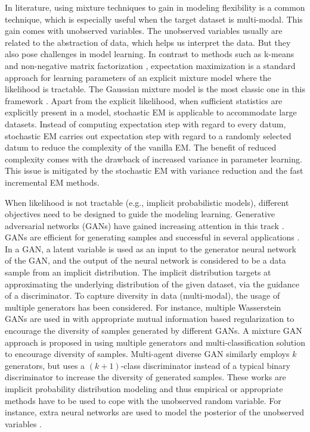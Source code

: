 In literature, using mixture techniques to gain in modeling flexibility is a common technique, which is especially useful when the target dataset is multi-modal. This gain comes with unobserved variables. The unobserved variables usually are related to the abstraction of data, which helps us interpret the data. But they also pose challenges in model learning. In contrast to methods such as k-means \cite{ICML-2012-KulisJ} and non-negative matrix factorization \cite{zhirong2016JMLR}, expectation maximization \cite{dempster1977maximum} is a standard approach for learning parameters of an explicit mixture model where the likelihood is tractable. The Gaussian mixture model is the most classic one in this framework \cite{Bishop:2006:PRM:1162264}.
Apart from the explicit likelihood, when sufficient statistics are explicitly present in a model, stochastic EM \cite{cappe2009sem} is applicable to accommodate large datasets. Instead of computing expectation step with regard to every datum, stochastic EM carries out expectation step with regard to a randomly selected datum to reduce the complexity of the vanilla EM. The benefit of reduced complexity comes with the drawback of increased variance in parameter learning. This issue is mitigated by the stochastic EM with variance reduction\cite{chen2018emvr} and the fast incremental EM \cite{karimi2019incrementalEM} methods.


When likelihood is not tractable (e.g., implicit probabilistic models), different objectives need to be designed to guide the modeling learning. Generative adversarial networks (GANs) have gained increasing attention in this track \cite{goodfellow2014gan, NIPS2016_6125, 2018arXiv180508318Z, salimans2018improving}.
GANs are efficient for generating samples and successful in several applications \cite{ledig2017photo, NIPS2016_6125}. In a GAN, a latent variable is used as
an input to the generator neural network of the GAN, and the output of the neural network is considered to be a data sample from an implicit distribution. The implicit distribution targets at approximating the underlying distribution of the given dataset, via the guidance of a discriminator.
To capture diversity in data (multi-modal), the usage of multiple generators has been considered. For instance, multiple Wasserstein GANs \cite{2017arXiv170107875A} are used in \cite{2018arXiv180600880K} with appropriate mutual information based regularization to encourage the diversity of samples generated by different GANs.
A mixture GAN approach is proposed in \cite{hoang2018mgan} using multiple generators and multi-classification solution to
encourage diversity of samples. Multi-agent diverse GAN \cite{DBLP:journals/corr/GhoshKNTD17} similarly employs $k$ generators, but uses a $(k+1)$-class discriminator instead of a typical binary discriminator to increase the diversity of generated samples. These works are implicit probability distribution modeling and thus empirical or appropriate methods have to be used to cope with the unobserved random variable. For instance, extra neural networks are used to model the posterior of the unobserved variables \cite{donahue2017adversarial, dumoulin2017adversarially}. 


